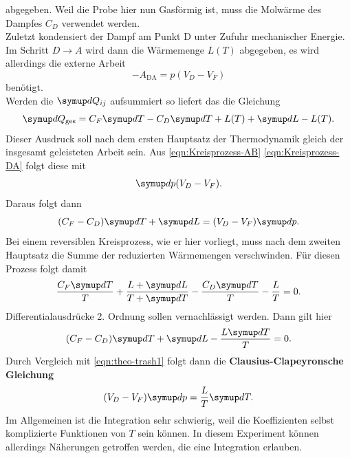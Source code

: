 abgegeben. Weil die Probe hier nun Gasförmig ist, muss die Molwärme des Dampfes $C_D$
verwendet werden.
\\
Zuletzt kondensiert der Dampf am Punkt D unter Zufuhr mechanischer Energie. Im Schritt 
$D \rightarrow A$ wird dann die Wärmemenge $L(T)$ abgegeben, es wird allerdings die
externe Arbeit
\begin{equation}
	-A_\text{DA} = p(V_D - V_F)
	\label{eqn:Kreisprozess-DA}
\end{equation}
benötigt.
\\
Werden die $\symup dQ_{ij}$ aufsummiert so liefert das die Gleichung
\begin{equation}
	\symup dQ_\text{ges} = C_F \symup dT - C_D \symup dT + L(T) + \symup dL - L(T).
\end{equation}
Dieser Ausdruck soll nach dem ersten Hauptsatz der Thermodynamik gleich der insgesamt
geleisteten Arbeit sein. Aus \autoref{eqn:Kreisprozess-AB} \autoref{eqn:Kreisprozess-DA}
folgt diese mit
\[
	\symup dp (V_D - V_F).
\]
Daraus folgt dann
\begin{equation}
	(C_F - C_D) \symup dT + \symup dL = (V_D - V_F) \symup dp.
	\label{eqn:theo-trash1}
\end{equation}
Bei einem reversiblen Kreisprozess, wie er hier vorliegt, muss nach dem zweiten Hauptsatz
die Summe der reduzierten Wärmemengen verschwinden. Für diesen Prozess folgt damit
\begin{equation}
	\frac{C_F \symup dT}{T} + \frac{L + \symup dL}{T + \symup dT} - \frac{C_D \symup dT}{T} - \frac{L}{T} = 0.
\end{equation}
Differentialausdrücke 2. Ordnung sollen vernachlässigt werden. Dann gilt hier
\begin{equation}
	(C_F - C_D) \symup dT + \symup dL - \frac{L \symup dT}{T} = 0.
	\label{eqn:theo-trash2}
\end{equation}
Durch Vergleich mit \autoref{eqn:theo-trash1} folgt dann die 
\textbf{Clausius-Clapeyronsche Gleichung}
\begin{equation}
	(V_D - V_F) \symup dp = \frac{L}{T} \symup dT.
	\label{eqn:clausisus-clapeyron}
\end{equation}
Im Allgemeinen ist die Integration sehr schwierig, weil die Koeffizienten selbst
komplizierte Funktionen von $T$ sein können. In diesem Experiment können allerdings
Näherungen getroffen werden, die eine Integration erlauben.

